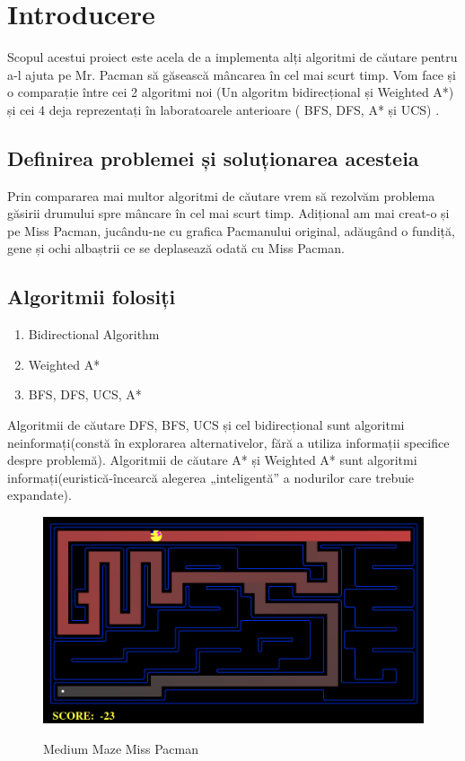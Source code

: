 \section{Introducere}

Scopul acestui proiect este acela de a implementa alți algoritmi de căutare pentru a-l ajuta pe Mr. Pacman să găsească mâncarea în cel mai scurt timp. Vom face și o comparație între cei 2 algoritmi noi (Un algoritm bidirecțional și Weighted A*) și cei 4 deja reprezentați în laboratoarele anterioare ( BFS, DFS, A* și UCS) . \newline


\subsection{Definirea problemei și soluționarea acesteia}

Prin compararea mai multor algoritmi de căutare vrem să rezolvăm problema găsirii drumului spre mâncare în cel mai scurt timp. 
\newline
\newline
Adițional am mai creat-o și pe Miss Pacman, jucându-ne cu grafica Pacmanului original, adăugând o fundiță, gene și ochi albaștrii ce se deplasează odată cu Miss Pacman. 

\subsection{Algoritmii folosiți}

\begin{enumerate}
  \item Bidirectional Algorithm
  \item Weighted A* 
  \item BFS, DFS, UCS, A*
\end{enumerate}
\newline
Algoritmii de căutare DFS, BFS, UCS și cel bidirecțional sunt algoritmi neinformați(constă în explorarea alternativelor, fără a utiliza informații specifice despre problemă).
\newline
\newline
Algoritmii de căutare A* și Weighted A* sunt algoritmi informați(euristică-încearcă alegerea „inteligentă” a nodurilor care trebuie expandate).
\newline

\begin{figure}[h]
    \centering
    \includegraphics[width=16cm]{text/images/pic1.png}\\
    \caption{Medium Maze Miss Pacman}
\end{figure}




